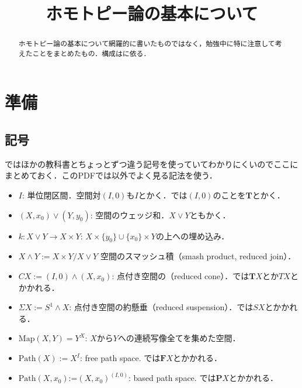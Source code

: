 \documentclass[a4paper,11pt]{jsarticle}
\theoremstyle{definition}
\begin{document}
\date{}
\title{ホモトピー論の基本について}

\maketitle

\begin{abstract}
  ホモトピー論の基本について網羅的に書いたものではなく，勉強中に特に注意して考えたことをまとめたもの．構成は\cite{fomenko2016homotopical}\cite{whitehead2012elements}に依る．
\end{abstract}

\tableofcontents

\section{準備}
\subsection{記号}

\cite{whitehead2012elements}ではほかの教科書とちょっとずつ違う記号を使っていてわかりにくいのでここにまとめておく．このPDFでは\cite{whitehead2012elements}以外でよく見る記法を使う．

\begin{itemize}
  \item $I$: 単位閉区間．空間対$(I,0)$も$I$とかく．\cite{whitehead2012elements}では$(I,0)$のことを$\mathbf{T}$とかく．
  \item $(X,x_0)\vee (Y,y_0)$: 空間のウェッジ和．$X\vee Y$ともかく．
  \item {}$k\colon X\vee Y\to X\times Y$: $X\times\{y_0\}\cup\{x_0\}\times Y$の上への埋め込み．
  \item {}$X\wedge Y:=X\times Y/X\vee Y$ 空間のスマッシュ積（smash product, reduced join）．
  \item {}$CX:=(I,0)\wedge (X,x_0)$: 点付き空間の（reduced cone）．\cite{whitehead2012elements}では$\mathbf{T}X$とか$TX$とかかれる．
  \item {}$\Sigma X:=S^1\wedge X$: 点付き空間の約懸垂（reduced suspension）．\cite{whitehead2012elements}では$SX$とかかれる．
  \item {}$\mathrm{Map}(X,Y)=Y^X$: $X$から$Y$への連続写像全てを集めた空間．
  \item $\mathrm{Path}(X):=X^I$: free path space. \cite{whitehead2012elements}では$\mathbf{F}X$とかかれる．
  \item $\mathrm{Path}(X,x_0)$:=$(X,x_0)^{(I,0)}$: based path space. \cite{whitehead2012elements}では$\mathbf{P}X$とかかれる．
\end{itemize}
\end{document}
